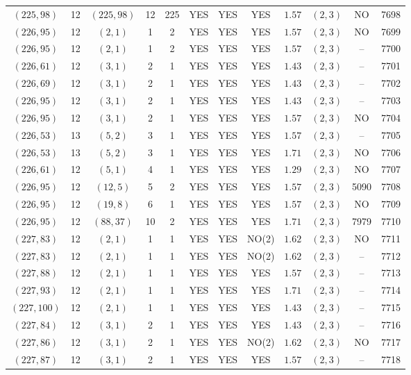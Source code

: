 \begin{longtable}{|c|c|c|c|c|c|c|c|c|c|c|c|}
$(225,98)$ & 12 & $(225,98)$ & 12 & 225 & YES & YES & YES & $1.57$ & $(2,3)$ & NO & 7698\\
$(226,95)$ & 12 & $(2,1)$ & 1 & 2 & YES & YES & YES & $1.57$ & $(2,3)$ & NO & 7699\\
$(226,95)$ & 12 & $(2,1)$ & 1 & 2 & YES & YES & YES & $1.57$ & $(2,3)$ & -- & 7700\\
$(226,61)$ & 12 & $(3,1)$ & 2 & 1 & YES & YES & YES & $1.43$ & $(2,3)$ & -- & 7701\\
$(226,69)$ & 12 & $(3,1)$ & 2 & 1 & YES & YES & YES & $1.43$ & $(2,3)$ & -- & 7702\\
$(226,95)$ & 12 & $(3,1)$ & 2 & 1 & YES & YES & YES & $1.43$ & $(2,3)$ & -- & 7703\\
$(226,95)$ & 12 & $(3,1)$ & 2 & 1 & YES & YES & YES & $1.57$ & $(2,3)$ & NO & 7704\\
$(226,53)$ & 13 & $(5,2)$ & 3 & 1 & YES & YES & YES & $1.57$ & $(2,3)$ & -- & 7705\\
$(226,53)$ & 13 & $(5,2)$ & 3 & 1 & YES & YES & YES & $1.71$ & $(2,3)$ & NO & 7706\\
$(226,61)$ & 12 & $(5,1)$ & 4 & 1 & YES & YES & YES & $1.29$ & $(2,3)$ & NO & 7707\\
$(226,95)$ & 12 & $(12,5)$ & 5 & 2 & YES & YES & YES & $1.57$ & $(2,3)$ & 5090 & 7708\\
$(226,95)$ & 12 & $(19,8)$ & 6 & 1 & YES & YES & YES & $1.57$ & $(2,3)$ & NO & 7709\\
$(226,95)$ & 12 & $(88,37)$ & 10 & 2 & YES & YES & YES & $1.71$ & $(2,3)$ & 7979 & 7710\\
$(227,83)$ & 12 & $(2,1)$ & 1 & 1 & YES & YES & NO(2) & $1.62$ & $(2,3)$ & NO & 7711\\
$(227,83)$ & 12 & $(2,1)$ & 1 & 1 & YES & YES & NO(2) & $1.62$ & $(2,3)$ & -- & 7712\\
$(227,88)$ & 12 & $(2,1)$ & 1 & 1 & YES & YES & YES & $1.57$ & $(2,3)$ & -- & 7713\\
$(227,93)$ & 12 & $(2,1)$ & 1 & 1 & YES & YES & YES & $1.71$ & $(2,3)$ & -- & 7714\\
$(227,100)$ & 12 & $(2,1)$ & 1 & 1 & YES & YES & YES & $1.43$ & $(2,3)$ & -- & 7715\\
$(227,84)$ & 12 & $(3,1)$ & 2 & 1 & YES & YES & YES & $1.43$ & $(2,3)$ & -- & 7716\\
$(227,86)$ & 12 & $(3,1)$ & 2 & 1 & YES & YES & NO(2) & $1.62$ & $(2,3)$ & NO & 7717\\
$(227,87)$ & 12 & $(3,1)$ & 2 & 1 & YES & YES & YES & $1.57$ & $(2,3)$ & -- & 7718\\

\end{longtable}

